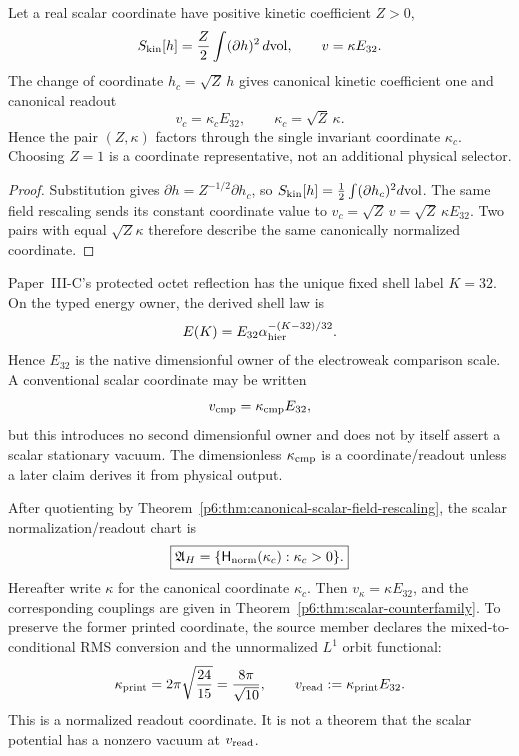 \documentclass[11pt,a4paper]{article}
\begin{document}
\begin{theorem}
\label{p6:thm:canonical-scalar-field-rescaling}
Let a real scalar coordinate have positive kinetic coefficient \(Z>0\),
\[
S_{\rm kin}[h]=\frac Z2\int(\partial h)^2\,d{\rm vol},
\qquad
v=\kappa E_{32}.
\]
The change of coordinate \(h_c=\sqrt Z\,h\) gives canonical kinetic
coefficient one and canonical readout
\[
v_c=\kappa_cE_{32},
\qquad
\kappa_c=\sqrt Z\,\kappa.
\]
Hence the pair \((Z,\kappa)\) factors through the single invariant coordinate
\(\kappa_c\).  Choosing \(Z=1\) is a coordinate representative, not an
additional physical selector.
\end{theorem}

\begin{proof}
Substitution gives \(\partial h=Z^{-1/2}\partial h_c\), so
\(S_{\rm kin}[h]=\frac12\int(\partial h_c)^2d{\rm vol}\).  The same field
rescaling sends its constant coordinate value to
\(v_c=\sqrt Z\,v=\sqrt Z\,\kappa E_{32}\).  Two pairs with equal
\(\sqrt Z\kappa\) therefore describe the same canonically normalized
coordinate.
\end{proof}

\begin{corollary}
\label{p6:cor:v571-native-ew-scale-owner}
Paper~III-C's protected octet reflection has the unique fixed shell label
\(K=32\).  On the typed energy owner, the derived shell law is
\[
 E(K)=E_{32}\alpha_{\rm hier}^{-(K-32)/32}.
\]
Hence \(E_{32}\) is the native dimensionful owner of the electroweak
comparison scale.  A conventional scalar coordinate may be written
\[
 v_{\rm cmp}=\kappa_{\rm cmp}E_{32},
\]
but this introduces no second dimensionful owner and does not by itself
assert a scalar stationary vacuum.  The dimensionless \(\kappa_{\rm cmp}\)
is a coordinate/readout unless a later claim derives it from physical output.
\end{corollary}

\begin{definition}
\label{p6:def:selected-scalar-normalization}
After quotienting by Theorem~\ref{p6:thm:canonical-scalar-field-rescaling},
the scalar normalization/readout chart is
\[
\boxed{
\mathfrak A_H
=
\{\mathsf H_{\rm norm}(\kappa_c):\kappa_c>0\}.
}
\]
Hereafter write \(\kappa\) for the canonical coordinate \(\kappa_c\).  Then
\(v_\kappa=\kappa E_{32}\), and the corresponding couplings are given in
Theorem~\ref{p6:thm:scalar-counterfamily}.  To preserve the former printed
coordinate, the source member declares the mixed-to-conditional RMS
conversion and the unnormalized
\(L^1\) orbit functional:
\[
\kappa_{\rm print}
=2\pi\sqrt{\frac{24}{15}}
=\frac{8\pi}{\sqrt{10}},
\qquad
v_{\rm read}:=\kappa_{\rm print}E_{32}.
\]
This is a normalized readout coordinate.  It is not a theorem that the
scalar potential has a nonzero vacuum at \(v_{\rm read}\).
\end{definition}
\end{document}
